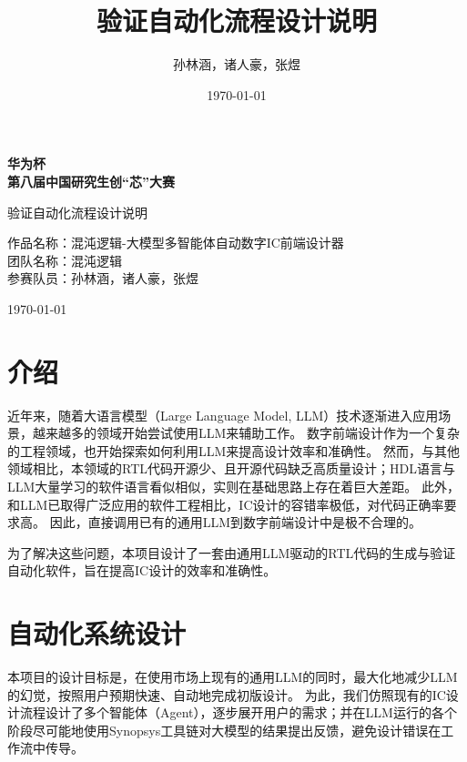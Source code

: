 \documentclass[UTF8]{ctexart}
\title{验证自动化流程设计说明}
\author{孙林涵，诸人豪，张煜}
\date{\today}
\begin{document}
\begin{titlepage}
    \centering
    \vspace*{3cm}
    
    {\Huge \bfseries 华为杯\\[1em]
    第八届中国研究生创“芯”大赛\\[3em]}
    
    {\LARGE 验证自动化流程设计说明\\[5em]}
    
    {\Large
    作品名称：混沌逻辑-大模型多智能体自动数字IC前端设计器\hspace{6cm} \\[2em]
    团队名称：混沌逻辑\hspace{6cm} \\[2em]
    参赛队员：孙林涵，诸人豪，张煜\hspace{6cm} \\[5em]
    }
    
    \vfill
    {\large \today}
\end{titlepage}

\tableofcontents

\newpage

\section{介绍}
近年来，随着大语言模型（Large Language Model, LLM）技术逐渐进入应用场景，越来越多的领域开始尝试使用LLM来辅助工作。
数字前端设计作为一个复杂的工程领域，也开始探索如何利用LLM来提高设计效率和准确性。
然而，与其他领域相比，本领域的RTL代码开源少、且开源代码缺乏高质量设计；HDL语言与LLM大量学习的软件语言看似相似，实则在基础思路上存在着巨大差距。
此外，和LLM已取得广泛应用的软件工程相比，IC设计的容错率极低，对代码正确率要求高。
因此，直接调用已有的通用LLM到数字前端设计中是极不合理的。

为了解决这些问题，本项目设计了一套由通用LLM驱动的RTL代码的生成与验证自动化软件，旨在提高IC设计的效率和准确性。

\section{自动化系统设计}

本项目的设计目标是，在使用市场上现有的通用LLM的同时，最大化地减少LLM的幻觉，按照用户预期快速、自动地完成初版设计。
为此，我们仿照现有的IC设计流程设计了多个智能体（Agent），逐步展开用户的需求；并在LLM运行的各个阶段尽可能地使用Synopsys工具链对大模型的结果提出反馈，避免设计错误在工作流中传导。
\end{document}
